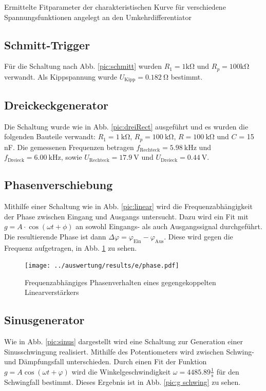 \begin{table}
	\centering
	
	\caption{Ermittelte Fitparameter der charakteristischen Kurve für verschiedene Spannungsfunktionen angelegt an den Umkehrdifferentiator}
	\label{table:c fitParameter}
\end{table}

\subsection{Schmitt-Trigger}
Für die Schaltung nach Abb. \ref{pic:schmitt} wurden $R_1 = 1 \si{\kilo\ohm}$ und $R_p = 100 \si{\kilo\ohm}$ verwandt. Als Kippspannung wurde $U_\text{Kipp} = 0.182\ \si{\ohm}$ bestimmt.

\subsection{Dreickeckgenerator}
Die Schaltung wurde wie in Abb. \ref{pic:dreiRect} ausgeführt und es wurden die folgenden Bauteile verwandt: $R_1 = 1\ \si{\kilo\ohm}$, $R_p = 100\ \si{\kilo\ohm}$, $R = 100\ \si{\kilo\ohm}$ und $C$ = 15 nF. Die gemessenen Frequenzen betragen $f_\text{Rechteck} = 5.98\ \si{\kilo\hertz}$ und $f_\text{Dreieck} = 6.00\ \si{\kilo\hertz}$, sowie $U_\text{Rechteck} = 17.9\ \si{\volt}$ und $U_\text{Dreieck} = 0.44\ \si{\volt}$.

\subsection{Phasenverschiebung}
Mithilfe einer Schaltung wie in Abb. \ref{pic:linear} wird die Frequenzabhängigkeit der Phase zwischen Eingang und Ausgangs untersucht. Dazu wird ein Fit mit $g = A \cdot \cos (\omega t + \phi)$ an sowohl Eingangs- als auch Ausgangssignal durchgeführt. Die resultierende Phase ist dann $\Delta \varphi = \varphi_\text{Ein} - \varphi_\text{Aus}$. Diese wird gegen die Frequenz aufgetragen, in Abb. \ref{pic:e phase} zu sehen.

\begin{figure}
	\centering
	\texttt{[image: ../auswertung/results/e/phase.pdf]}
	\caption{Frequenzabhängiges Phasenverhalten eines gegengekoppelten Linearverstärkers}
	\label{pic:e phase}
\end{figure}


\subsection{Sinusgenerator}
Wie in Abb. \ref{pic:sinus} dargestellt wird eine Schaltung zur Generation einer Sinusschwingung realisiert. Mithilfe des Potentiometers wird zwischen Schwing- und Dämpfungsfall unterschieden. Durch einen Fit der Funktion $g = A\cos(\omega t + \varphi)$ wird die Winkelgeschwindigkeit $\omega = 4485.89 \frac{1}{\si{\second}}$ für den Schwingfall bestimmt. Dieses Ergebnis ist in Abb. \ref{pic:g schwing} zu sehen.

